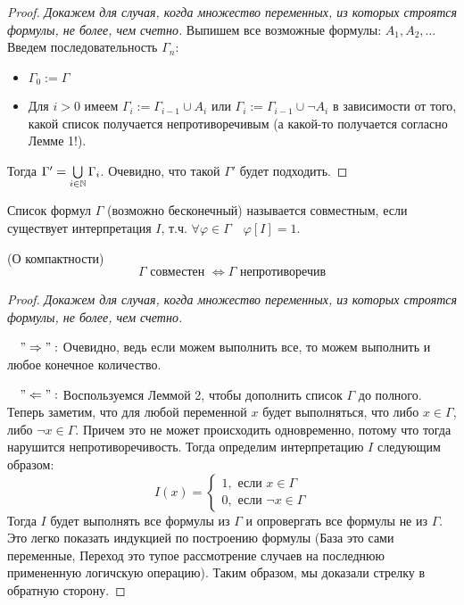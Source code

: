 \begin{proof}
    \textit{Докажем для случая, когда множество переменных, из которых строятся формулы, не более, чем счетно.} Выпишем все возможные формулы: $A_1, A_2, \dots$ Введем последовательность $\Gamma_n$: \begin{itemize}
        \item $\Gamma_0 := \Gamma$
        \item Для $i > 0$ имеем $\Gamma_i := \Gamma_{i - 1} \cup A_i$ или $\Gamma_i := \Gamma_{i - 1} \cup \neg A_i$ в зависимости от того, какой список получается непротиворечивым (а какой-то получается согласно Лемме 1!).
    \end{itemize}
    \quad Тогда $\Gamma' = \bigcup\limits_{i \in \mathbb{N}} \Gamma_i$. Очевидно, что такой $\Gamma'$ будет подходить. 
\end{proof}

\vspace{5mm}

\begin{conj}
    Список формул $\Gamma$ (возможно бесконечный) называется совместным, если существует интерпретация $I$, т.ч. $\forall \varphi \in \Gamma \quad \varphi[I] = 1$.
\end{conj}

\begin{theorem}
    (О компактности) \[ \Gamma \text{ совместен } \Longleftrightarrow \Gamma \text{ непротиворечив} \]
\end{theorem}

\begin{proof}
    \textit{Докажем для случая, когда множество переменных, из которых строятся формулы, не более, чем счетно.}

    $\quad "\Rightarrow":$ Очевидно, ведь если можем выполнить все, то можем выполнить и любое конечное количество.

    $\quad "\Leftarrow":$ Воспользуемся Леммой 2, чтобы дополнить список $\Gamma$ до полного. Теперь заметим, что для любой переменной $x$ будет выполняться, что либо $x \in \Gamma$, либо $\neg x \in \Gamma$. Причем это не может происходить одновременно, потому что тогда нарушится непротиворечивость. Тогда определим интерпретацию $I$ следующим образом: \[ I(x) = \begin{cases}
        1, \text{ если } x \in \Gamma \\
        0, \text{ если } \neg x \in \Gamma
    \end{cases} \]
    \quad Тогда $I$ будет выполнять все формулы из $\Gamma$ и опровергать все формулы не из $\Gamma$. Это легко показать индукцией по построению формулы (База это сами переменные, Переход это тупое рассмотрение случаев на последнюю примененную логичскую операцию). Таким образом, мы доказали стрелку в обратную сторону.
\end{proof}

